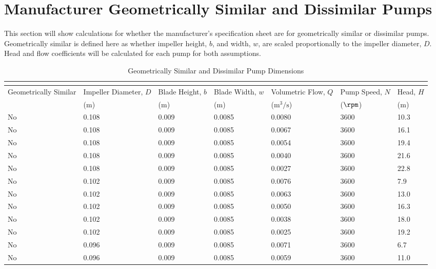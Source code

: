 \section{Manufacturer Geometrically Similar and Dissimilar Pumps}
\label{sec:geometrically_similar_pumps}
This section will show calculations for whether the manufacturer's specification sheet are for geometrically similar or dissimilar pumps. Geometrically similar is defined here as whether impeller height, $b$, and width, $w$, are scaled proportionally to the impeller diameter, $D$. Head and flow coefficients will be calculated for each pump for both assumptions.

\begin{longtable}{p{}C{0.10\textwidth}C{0.10\textwidth}C{0.10\textwidth}C{0.10\textwidth}C{0.10\textwidth}C{0.10\textwidth}}
    \caption{Geometrically Similar and Dissimilar Pump Dimensions} \\
    \label{tab:geometrically_similar_pumps} \\[-8ex]
    \toprule
    Geometrically Similar & Impeller Diameter, $D$ & Blade Height, $b$ & Blade Width, $w$ & Volumetric Flow, $Q$ & Pump Speed, $N$ & Head, $H$ \\
    & ($\unit{\meter}$) & ($\unit{\meter}$) & ($\unit{\meter}$) & ($\unit{\meter\cubed\per\second}$) & ($\unit{\rpm}$) & ($\unit{\meter}$) \\
    \midrule
    No & 0.108 & 0.009 & 0.0085 & 0.0080 & 3600 & 10.3 \\
    No & 0.108 & 0.009 & 0.0085 & 0.0067 & 3600 & 16.1 \\
    No & 0.108 & 0.009 & 0.0085 & 0.0054 & 3600 & 19.4 \\
    No & 0.108 & 0.009 & 0.0085 & 0.0040 & 3600 & 21.6 \\
    No & 0.108 & 0.009 & 0.0085 & 0.0027 & 3600 & 22.8 \\
    No & 0.102 & 0.009 & 0.0085 & 0.0076 & 3600 & 7.9 \\
    No & 0.102 & 0.009 & 0.0085 & 0.0063 & 3600 & 13.0 \\
    No & 0.102 & 0.009 & 0.0085 & 0.0050 & 3600 & 16.3 \\
    No & 0.102 & 0.009 & 0.0085 & 0.0038 & 3600 & 18.0 \\
    No & 0.102 & 0.009 & 0.0085 & 0.0025 & 3600 & 19.2 \\
    No & 0.096 & 0.009 & 0.0085 & 0.0071 & 3600 & 6.7 \\
    No & 0.096 & 0.009 & 0.0085 & 0.0059 & 3600 & 11.0 \\

\end{longtable}
